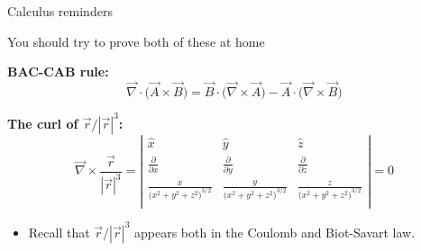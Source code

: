 %
%

{
\reminderslide

%
%
%

\begin{frame}{Calculus reminders}

You should try to prove both of these at home\\
\vspace{0.3cm}

{\bf BAC-CAB rule:}\\
\begin{equation*}
   \vec{\nabla} \cdot \Big( \vec{A} \times \vec{B} \Big) =
      \vec{B} \cdot \Big( \vec{\nabla} \times \vec{A} \Big) -
      \vec{A} \cdot \Big( \vec{\nabla} \times \vec{B} \Big)
\end{equation*}

\vspace{0.2cm}

{\bf The curl of $\vec{r}/|\vec{r}|^3$:}\\
\begin{equation*}
  \vec{\nabla} \times \frac{\vec{r}}{|\vec{r}|^3} =
      \left|
    \begin{array}{ccc}
      \hat{x} & \hat{y} & \hat{z} \\
      \frac{\partial}{\partial x} & \frac{\partial}{\partial y} & \frac{\partial}{\partial z} \\
      \frac{x}{\Big(x^2 + y^2 + z^2 \Big)^{3/2}} & \frac{y}{\Big(x^2 + y^2 + z^2 \Big)^{3/2}} & \frac{z}{\Big(x^2 + y^2 + z^2 \Big)^{3/2}}\\
    \end{array}
   \right| = 0
\end{equation*}

\begin{itemize}
  \item Recall that $\vec{r}/|\vec{r}|^3$ appears both in the Coulomb and Biot-Savart law.
\end{itemize}

\end{frame}

} %

%
%
%

